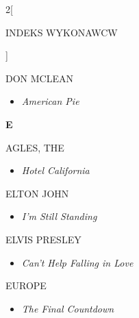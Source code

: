 \documentclass[a4paper]{report}
\begin{document}
\begin{multicols*}{2}[\begin{Huge}INDEKS WYKONAWCW\end{Huge}\vspace{1cm}]
\begin{minipage}{\columnwidth}
\begin{itemize}[topsep=3pt, after=\vspace{3mm}]
	\end{itemize}
\end{minipage}
\begin{minipage}{\columnwidth}
	DON MCLEAN 
	\begin{itemize}[topsep=3pt, after=\vspace{3mm}]
		\itemsep0em
		\item[]\textit{American Pie}  \\
	\end{itemize}
\end{minipage}
\begin{minipage}{\columnwidth}
	\begin{Large}\textbf{E}\end{Large}AGLES, THE 
	\begin{itemize}[topsep=3pt, after=\vspace{3mm}]
		\itemsep0em
		\item[]\textit{Hotel California}  \\
	\end{itemize}
\end{minipage}
\begin{minipage}{\columnwidth}
	ELTON JOHN 
	\begin{itemize}[topsep=3pt, after=\vspace{3mm}]
		\itemsep0em
		\item[]\textit{I'm Still Standing}  \\
	\end{itemize}
\end{minipage}
\begin{minipage}{\columnwidth}
	ELVIS PRESLEY 
	\begin{itemize}[topsep=3pt, after=\vspace{3mm}]
		\itemsep0em
		\item[]\textit{Can't Help Falling in Love}  \\
	\end{itemize}
\end{minipage}
\begin{minipage}{\columnwidth}
	EUROPE 
	\begin{itemize}[topsep=3pt, after=\vspace{3mm}]
		\itemsep0em
		\item[]\textit{The Final Countdown}  \\
	\end{itemize}
\end{minipage}
\begin{minipage}{\columnwidth}

\end{minipage}
\end{multicols*}
\end{document}
